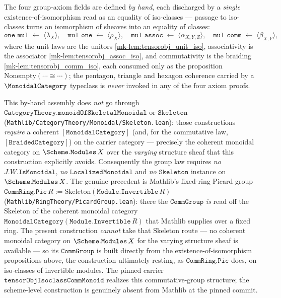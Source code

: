 \begin{lemma}
  The four group-axiom fields are defined \emph{by hand}, each discharged by a
  \emph{single} existence-of-isomorphism read as an equality of iso-classes --- passage
  to iso-classes turns an isomorphism of sheaves into an equality of classes:
  \[
    \mathtt{one\_mul} \;\leftarrow\; \langle \lambda_X \rangle,
    \quad
    \mathtt{mul\_one} \;\leftarrow\; \langle \rho_X \rangle,
    \quad
    \mathtt{mul\_assoc} \;\leftarrow\; \langle \alpha_{X,Y,Z} \rangle,
    \quad
    \mathtt{mul\_comm} \;\leftarrow\; \langle \beta_{X,Y} \rangle,
  \]
  where the unit laws are the unitors \ref{mk-lem:tensorobj_unit_iso}, associativity is
  the associator \ref{mk-lem:tensorobj_assoc_iso}, and commutativity is the braiding
  \ref{mk-lem:tensorobj_comm_iso}, each consumed only as the proposition
  \(\mathrm{Nonempty}(\cdots \cong \cdots)\); the pentagon, triangle and hexagon
  coherence carried by a \(\MonoidalCategory\) typeclass is \emph{never} invoked in
  any of the four axiom proofs.

  This by-hand assembly does \emph{not} go through
  \(\mathtt{CategoryTheory.monoidOfSkeletalMonoidal}\) or \(\mathtt{Skeleton}\)
  (\texttt{Mathlib/CategoryTheory/Monoidal/Skeleton.lean}): those constructions
  \emph{require} a coherent \([\mathtt{MonoidalCategory}]\) (and, for the commutative
  law, \([\mathtt{BraidedCategory}]\)) on the carrier category --- precisely the
  coherent monoidal category on \(\Scheme.\mathtt{Modules}\,X\) over the \emph{varying}
  structure sheaf that this construction explicitly avoids. Consequently the group law
  requires \emph{no} \(J.W.\mathtt{IsMonoidal}\), \emph{no}
  \(\mathtt{LocalizedMonoidal}\) and \emph{no} \(\mathtt{Skeleton}\) instance on
  \(\Scheme.\mathtt{Modules}\,X\). The genuine precedent is Mathlib's fixed-ring
  Picard group \(\mathtt{CommRing.Pic}\,R := \mathrm{Skeleton}(
  \mathtt{Module.Invertible}\,R)\) (\texttt{Mathlib/RingTheory/PicardGroup.lean}):
  there the \(\mathtt{CommGroup}\) \emph{is} read off the \(\mathrm{Skeleton}\) of the
  coherent monoidal category \(\mathtt{MonoidalCategory}(\mathtt{Module.Invertible}\,R)\)
  that Mathlib supplies over a fixed ring. The present construction \emph{cannot} take
  that \(\mathrm{Skeleton}\) route --- no coherent monoidal category on
  \(\Scheme.\mathtt{Modules}\,X\) for the varying structure sheaf is available --- so
  its \(\mathtt{CommGroup}\) is built directly from the existence-of-isomorphism
  propositions above, the construction ultimately resting, as
  \(\mathtt{CommRing.Pic}\) does, on iso-classes of invertible modules. The pinned
  carrier \(\mathtt{tensorObjIsoclassCommMonoid}\) realizes this commutative-group
  structure; the scheme-level construction is genuinely absent from Mathlib at the
  pinned commit.


\end{lemma}
